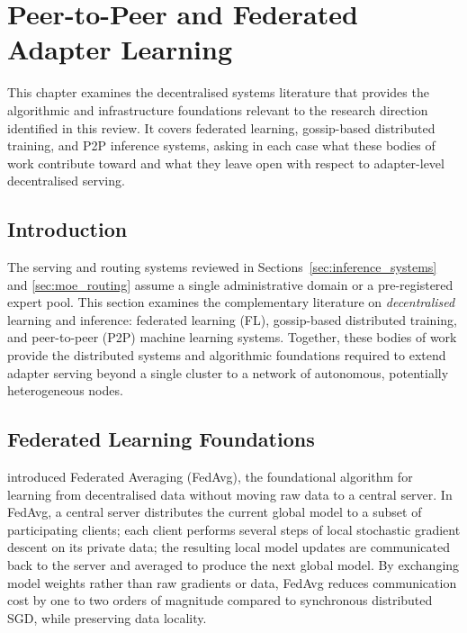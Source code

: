 \section{Peer-to-Peer and Federated Adapter Learning}
\label{sec:p2p_federated}

This chapter examines the decentralised systems literature that provides the
algorithmic and infrastructure foundations relevant to the research direction
identified in this review. It covers federated learning, gossip-based
distributed training, and P2P inference systems, asking in each case what
these bodies of work contribute toward and what they leave open with respect
to adapter-level decentralised serving.

\subsection{Introduction}
\label{sec:p2p_federated:intro}

The serving and routing systems reviewed in
Sections~\ref{sec:inference_systems} and \ref{sec:moe_routing} assume a single
administrative domain or a pre-registered expert pool. This section examines
the complementary literature on \textit{decentralised}
learning and inference: federated learning (FL), gossip-based distributed training,
and peer-to-peer (P2P) machine learning systems. Together, these bodies of work provide
the distributed systems and algorithmic foundations required to extend adapter serving
beyond a single cluster to a network of autonomous, potentially heterogeneous nodes.

\subsection{Federated Learning Foundations}
\label{sec:p2p_federated:fl_foundations}

\citet{McMahan2017} introduced Federated Averaging (FedAvg), the foundational algorithm
for learning from decentralised data without moving raw data to a central server. In
FedAvg, a central server distributes the current global model to a subset of participating
clients; each client performs several steps of local stochastic gradient descent on its
private data; the resulting local model updates are communicated back to the server and
averaged to produce the next global model. By exchanging model weights rather than raw
gradients or data, FedAvg reduces communication cost by one to two orders of magnitude
compared to synchronous distributed SGD, while preserving data locality.

